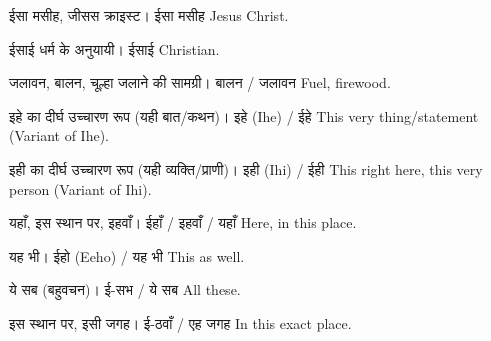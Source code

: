 %
{ईसा मसीह, जीसस क्राइस्ट।}%
{ईसा मसीह}%
{Jesus Christ.}

%
{ईसाई धर्म के अनुयायी।}%
{ईसाई}%
{Christian.}

%
{जलावन, बालन, चूल्हा जलाने की सामग्री।}%
{बालन / जलावन}%
{Fuel, firewood.}

%
{इहे का दीर्घ उच्चारण रूप (यही बात/कथन)।}%
{इहे (Ihe) / ईहे}%
{This very thing/statement (Variant of Ihe).}

%
{इही का दीर्घ उच्चारण रूप (यही व्यक्ति/प्राणी)।}%
{इही (Ihi) / ईही}%
{This right here, this very person (Variant of Ihi).}

%
{यहाँ, इस स्थान पर, इहवाँ।}%
{ईहाँ / इहवाँ / यहाँ}%
{Here, in this place.}

%
{यह भी।}%
{ईहो (Eeho) / यह भी}%
{This as well.}

%
{ये सब (बहुवचन)।}%
{ई-सभ / ये सब}%
{All these.}

%
{इस स्थान पर, इसी जगह।}%
{ई-ठवाँ / एह जगह}%
{In this exact place.}
